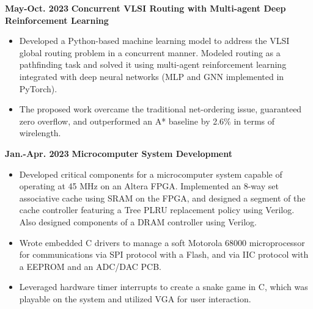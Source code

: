 \documentclass[11pt,a4paper,sans]{moderncv}
\begin{document}
\cventry
{\textnormal{\textbf{May-Oct. 2023}}}
{\textnormal{\textbf{Concurrent VLSI Routing with Multi-agent
Deep Reinforcement Learning}}}
{}{}{}
{
    \begin{itemize}
        \item Developed a Python-based machine learning model to address the VLSI global routing problem in a concurrent manner. Modeled routing as a pathfinding task and solved it using multi-agent reinforcement learning integrated with deep neural networks (MLP and GNN implemented in PyTorch).
        \item The proposed work overcame the traditional net-ordering issue, guaranteed zero overflow, and outperformed an A* baseline by 2.6\% in terms of wirelength.
        \end{itemize}
}


\cventry
{\textnormal{\textbf{Jan.-Apr. 2023}}}
{\textnormal{\textbf{Microcomputer System Development}}}
{}{}{}
{
    \begin{itemize}
    \item Developed critical components for a microcomputer system capable of operating at 45 MHz on an Altera FPGA. Implemented an 8-way set associative cache using SRAM on the FPGA, and designed a segment of the cache controller featuring a Tree PLRU replacement policy using Verilog. Also designed components of a DRAM controller using Verilog.
    \item Wrote embedded C drivers to manage a soft Motorola 68000 microprocessor for communications via SPI protocol with a Flash, and via IIC protocol with a EEPROM and an ADC/DAC PCB.
    \item Leveraged hardware timer interrupts to create a snake game in C, which was playable on the system and utilized VGA for user interaction.
    \end{itemize}
}
\end{document}
